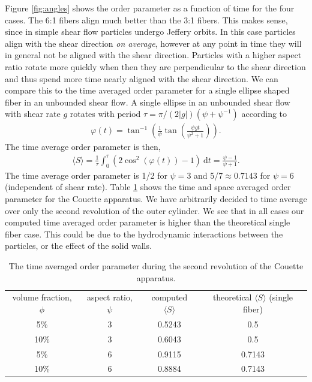 \documentclass[preprint, 10pt]{elsarticle}
\begin{document}
Figure \ref{fig:angles} shows the order parameter as a function of time
for the four cases. The 6:1 fibers align much better than the 3:1
fibers. This makes sense, since in simple shear flow particles undergo
Jeffery orbits. In this case particles align with the shear direction
\emph{on average}, however at any point in time they will in general not
be aligned with the shear direction. Particles with a higher aspect
ratio rotate more quickly when then they are perpendicular to the shear
direction and thus spend more time nearly aligned with the shear
direction. We can compare this to the time averaged order parameter for
a single ellipse shaped fiber in an unbounded shear flow. A single
ellipse in an unbounded shear flow with shear rate $g$ rotates with
period $\tau = \pi/(2| g|)(\psi + \psi^{-1})$ \cite{Jeffery1922}
according to 
\begin{align*}
  \varphi(t) = \tan^{-1}\left(\frac{1}{\psi}\tan\left(
    \frac{\psi gt}{\psi^2 + 1}\right)\right).
\end{align*}
The time average order parameter is then,
\begin{align*}
  \langle S\rangle = \frac{1}{\tau}\int_0^\tau\left( 
    2\cos^2(\varphi(t)) - 1\right)~\text{d}t = \frac{\psi -1}{\psi+1}.
\end{align*}
The time average order parameter is 1/2 for $\psi = 3$ and 5/7$\approx 0.7143$ for $\psi=6$
(independent of shear rate). Table \ref{tab:order} shows the time and space averaged order parameter
for the Couette apparatus. We have arbitrarily decided to time average over only the second
revolution of the outer cylinder. We see that in all cases our computed time averaged order
parameter is higher than the theoretical single fiber case. This could be due to the hydrodynamic
interactions between the particles, or the effect of the solid walls.

\begin{table}[!h]
\begin{center}
\begin{tabular}{c |c |c |c}
volume fraction, $\phi$ & aspect ratio, $\psi$ & computed $ \langle S \rangle$ & theoretical
$\langle S \rangle$ (single fiber)\\
5\% &3& 0.5243 & 0.5\\
10\% &3 & 0.6043 & 0.5\\
5\% & 6 & 0.9115 & 0.7143\\
10\% & 6 & 0.8884 & 0.7143
\end{tabular}
\end{center}
\caption{The time averaged order parameter during the second revolution of the Couette apparatus.
}\label{tab:order}
\end{table} 
\end{document}

